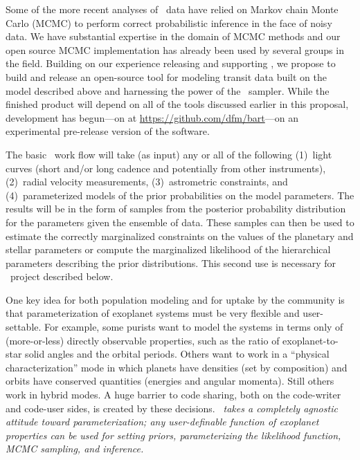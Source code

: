 \documentclass[letterpaper,12pt,preprint]{hack_aastex}
\newcommand{\hurl}[1]{{\scriptsize\url{#1}}}
\newcommand{\Bart}{\package{Bart}}
\newcommand{\emcee}{\package{emcee}}
\newcommand{\TheCreator}{\package{TheCreator}}
\begin{document}
Some of the more recent analyses of \Kepler\ data have relied on Markov chain
Monte Carlo (MCMC) to perform correct probabilistic inference in the face of
noisy data.
We have substantial expertise in the domain of MCMC methods
\citep{hou,emcee,brewer}
and our open source MCMC
implementation has already been used by several groups in the field.
Building on our experience releasing and supporting \emcee, we propose to
build and release an open-source tool for modeling transit data built on the
model described above and harnessing the power of the \emcee\ sampler.
While the finished product will depend on all of the tools discussed earlier
in this proposal, development has begun---on  at
\hurl{https://github.com/dfm/bart}---on an experimental pre-release version of
the software.

The basic \Bart\ work flow will take (as input) any or all of the following
(1)~light curves (short and/or long cadence and potentially from other
instruments),
(2)~radial velocity measurements,
(3)~astrometric constraints, and
(4)~parameterized models of the prior probabilities on the model parameters.
The results will be in the form of samples from the posterior probability
distribution for the parameters given the ensemble of data.
These samples can then be used to estimate the correctly marginalized
constraints on the values of the planetary and stellar parameters or compute
the marginalized likelihood of the hierarchical parameters describing the
prior distributions.
This second use is necessary for \TheCreator\ project described below.

One key idea for both population modeling and for uptake by the
community is that parameterization of exoplanet systems must be very
flexible and user-settable.  For example, some purists want to model
the systems in terms only of (more-or-less) directly observable
properties, such as the ratio of exoplanet-to-star solid angles and
the orbital periods.  Others want to work in a ``physical
characterization'' mode in which planets have densities (set by
composition) and orbits have conserved quantities (energies and
angular momenta).  Still others work in hybrid modes.  A huge barrier
to code sharing, both on the code-writer and code-user sides, is
created by these decisions.  \emph{\Bart\ takes a completely agnostic
attitude toward parameterization; any user-definable function of
exoplanet properties can be used for setting priors, parameterizing
the likelihood function, MCMC sampling, and inference.}
\end{document}
